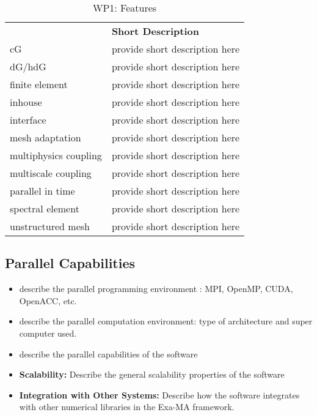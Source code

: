 \begin{table}[!ht]
    \centering
    {
        \setlength{\parindent}{0pt}
        \def\arraystretch{1.25}
        {
            \fontsize{9}{11}\selectfont
            \begin{tabular}{!{\color{numpexgray}\vrule}p{.25\linewidth}!{\color{numpexgray}\vrule}p{.6885\linewidth}!{\color{numpexgray}\vrule}}

     &  {\rule{0pt}{2.5ex}\color{white}\bf Short Description }\\

    cG & provide short description here \\
    dG/hdG & provide short description here \\
    finite element & provide short description here \\
    inhouse & provide short description here \\
    interface & provide short description here \\
    mesh adaptation & provide short description here \\
    multiphysics coupling & provide short description here \\
    multiscale coupling & provide short description here \\
    parallel in time & provide short description here \\
    spectral element & provide short description here \\
    unstructured mesh & provide short description here \\
\hline
\end{tabular}
        }
    }
    \caption{WP1: \Feelpp Features}
    \label{tab:WP1:Feelpp:features}
\end{table}


\subsection{Parallel Capabilities}
\label{sec:WP1:Feelpp:performances}


\begin{itemize}
    \item describe the parallel programming  environment : MPI, OpenMP, CUDA, OpenACC, etc.
    \item describe the parallel computation environment: type of architecture and super computer used.
    \item describe the parallel capabilities of the software
    \item \textbf{Scalability:} Describe the general scalability properties of the software
    \item \textbf{Integration with Other Systems:} Describe how the software integrates with other numerical libraries in the Exa-MA framework.
\end{itemize}


